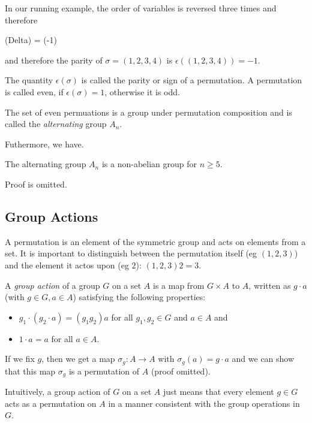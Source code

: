 In our running example, the order of variables is reversed three times and therefore

\bee
\sigma(Delta) = (-1) \Delta
\eee

and therefore the parity of $\sigma = (1,2,3,4)$ is $\epsilon((1,2,3,4)) = -1$.

\begin{definition}
The quantity $\epsilon(\sigma)$ is called the parity or sign of a permutation. A permutation is called even, if $\epsilon(\sigma) = 1$, otherwise it is odd.
\end{definition}

The set of even permuations is a group under permutation composition and is called the \emph{alternating} group $A_n$.

Futhermore, we have.

\begin{theorem}
The alternating group $A_n$ is a non-abelian group for $n \geq 5$.
\end{theorem}

Proof is omitted.


\subsection{Group Actions}

A permutation is an element of the symmetric group and acts on elements from a set. It is important to distinguish between the permutation itself (eg $(1,2,3)$) and the element it actos upon (eg $2$): $(1,2,3) 2 = 3$.

\begin{definition}
A \emph{group action} of a group $G$ on a set $A$ is a map from $G \times A$ to $A$, written as $g \cdot a$ (with $g \in G, a \in A$) satisfying the following properties:
\begin{itemize}
\item $g_1 \cdot (g_2 \cdot a) = (g_1 g_2) a$ for all $g_1, g_2 \in G$ and $a \in A$ and
\item $1 \cdot a = a$ for all $a \in A$.
\end{itemize}
\end{definition}

If we fix $g$, then we get a map $\sigma_g: A \rightarrow A$ with $\sigma_g(a) = g \cdot a$ and we can show that this map $\sigma_g$ is a permutation of $A$ (proof omitted).

Intuitively, a group action of $G$ on a set $A$ just means that every element $g \in G$ acts as a permutation on $A$ in a manner consistent with the group operations in $G$.

